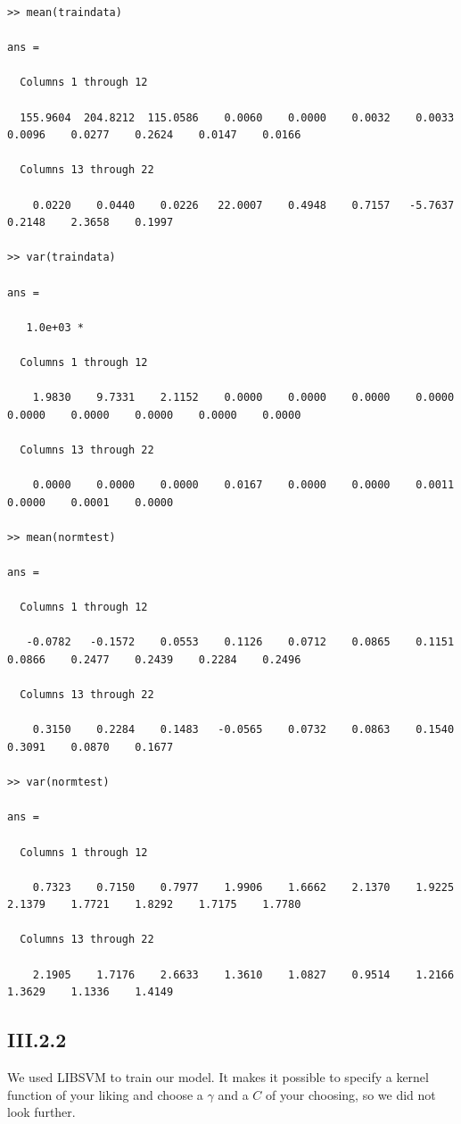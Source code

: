 \documentclass{article}
\begin{document}
\begin{verbatim}
>> mean(traindata)

ans =

  Columns 1 through 12

  155.9604  204.8212  115.0586    0.0060    0.0000    0.0032    0.0033    0.0096    0.0277    0.2624    0.0147    0.0166

  Columns 13 through 22

    0.0220    0.0440    0.0226   22.0007    0.4948    0.7157   -5.7637    0.2148    2.3658    0.1997

>> var(traindata)

ans =

   1.0e+03 *

  Columns 1 through 12

    1.9830    9.7331    2.1152    0.0000    0.0000    0.0000    0.0000    0.0000    0.0000    0.0000    0.0000    0.0000

  Columns 13 through 22

    0.0000    0.0000    0.0000    0.0167    0.0000    0.0000    0.0011    0.0000    0.0001    0.0000

>> mean(normtest)

ans =

  Columns 1 through 12

   -0.0782   -0.1572    0.0553    0.1126    0.0712    0.0865    0.1151    0.0866    0.2477    0.2439    0.2284    0.2496

  Columns 13 through 22

    0.3150    0.2284    0.1483   -0.0565    0.0732    0.0863    0.1540    0.3091    0.0870    0.1677

>> var(normtest)

ans =

  Columns 1 through 12

    0.7323    0.7150    0.7977    1.9906    1.6662    2.1370    1.9225    2.1379    1.7721    1.8292    1.7175    1.7780

  Columns 13 through 22

    2.1905    1.7176    2.6633    1.3610    1.0827    0.9514    1.2166    1.3629    1.1336    1.4149
\end{verbatim}

\subsection{III.2.2}

We used LIBSVM to train our model. It makes it possible to specify a
kernel function of your liking and choose a $\gamma$ and a $C$ of your
choosing, so we did not look further.
\end{document}
